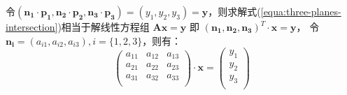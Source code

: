 令$(\bm{n_1} \cdot \bm{p_1}, \bm{n_2} \cdot \bm{p_2}, \bm{n_3} \cdot \bm{p_3})
= (y_1, y_2, y_3) = \bm{y}$，则求解式(\ref{equa:three-planes-intersection})相当于解线性方程组
$\bm{A} \bm{x}=\bm{y}$ 即 $(\bm{n_1},\bm{n_2}, \bm{n_3})^T \cdot \bm{x} = \bm{y}$， 令
$\bm{n_i} = (a_{i1}, a_{i2}, a_{i3}), i=\{1,2,3\}$，则有：
\begin{equation*}
  \label{equa:matrix:crammer}
  \left(
    \begin{array}{ccc}
      a_{11} & a_{12} & a_{13} \\
      a_{21} & a_{22} & a_{23} \\
      a_{31} & a_{32} & a_{33} \\
    \end{array}
  \right)
  \cdot 
  \bm{x} 
  =
  \left(
    \begin{array}{c}
      y_{1} \\
      y_{2} \\
      y_{3} \\
    \end{array}
  \right)
\end{equation*}

